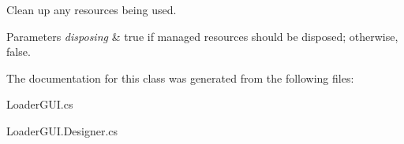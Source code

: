 Clean up any resources being used. 


\begin{DoxyParams}{Parameters}
{\em disposing} & true if managed resources should be disposed; otherwise, false.\\
\hline
\end{DoxyParams}


The documentation for this class was generated from the following files\+:\begin{DoxyCompactItemize}
\item 
Loader\+G\+U\+I.\+cs\item 
Loader\+G\+U\+I.\+Designer.\+cs\end{DoxyCompactItemize}
